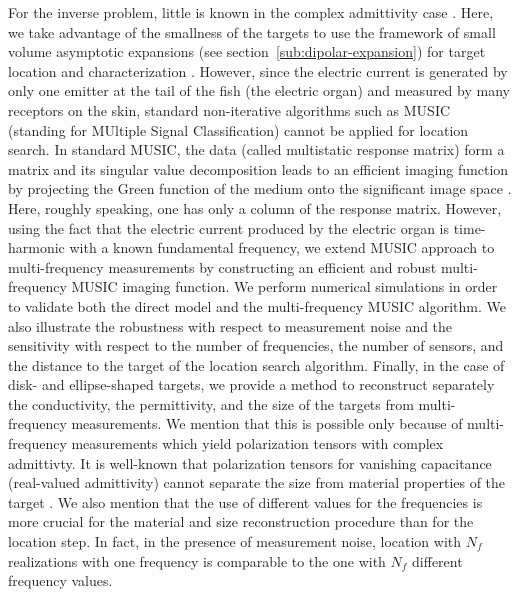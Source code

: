 For the inverse problem, little is known in the
complex admittivity case \cite{berettafrancini2011stability}. Here, we take advantage
of the smallness of the targets to use the framework of small
volume asymptotic expansions (see section~\ref{sub:dipolar-expansion}) for target location and
characterization \cite{ammari2004reconstruction,
ammari2007polarization}. However, since the electric current is
generated by only one emitter at the tail of the fish (the
electric organ) and measured by many receptors on the skin,
standard non-iterative algorithms such as MUSIC (standing for
MUltiple Signal Classification) cannot be applied for location
search. In standard MUSIC, the data (called multistatic response
matrix) form a matrix and its singular value decomposition leads
to an efficient imaging function by projecting the Green function
of the medium onto the significant image space
\cite{AGKPS2011cracks,AIL2005music,AKKLV2008music, bruhl2003direct, chambersberryman2006target, cheney2001linearsampling,
kirsch1999characterization}. Here, roughly speaking, one has only a column of the
response matrix. However, using the fact that the electric current
produced by the electric organ is time-harmonic with a known
fundamental frequency, we extend MUSIC approach to multi-frequency
measurements by constructing an efficient and robust
multi-frequency MUSIC imaging function. We perform numerical
simulations in order to validate both the direct model and the
multi-frequency MUSIC algorithm. We also illustrate the robustness
with respect to measurement noise and the sensitivity with respect
to the number of frequencies, the number of sensors, and the
distance to the target of the location search algorithm. Finally,
in the case of disk- and ellipse-shaped targets, we provide a
method to reconstruct separately the conductivity, the
permittivity, and the size of the targets from multi-frequency
measurements. We mention that this is possible only because of
multi-frequency measurements which yield polarization tensors with
complex admittivty. It is well-known that polarization tensors
for vanishing capacitance (\ie real-valued admittivity) cannot separate the size from material
properties of the target \cite{ammari2007polarization}. We also
mention that the use of different values for the frequencies is
more crucial for the material and size reconstruction procedure
than for the location step. In fact, in the presence of
measurement noise, location with $N_f$ realizations with one
frequency is comparable to the one with $N_f$ different frequency
values.

